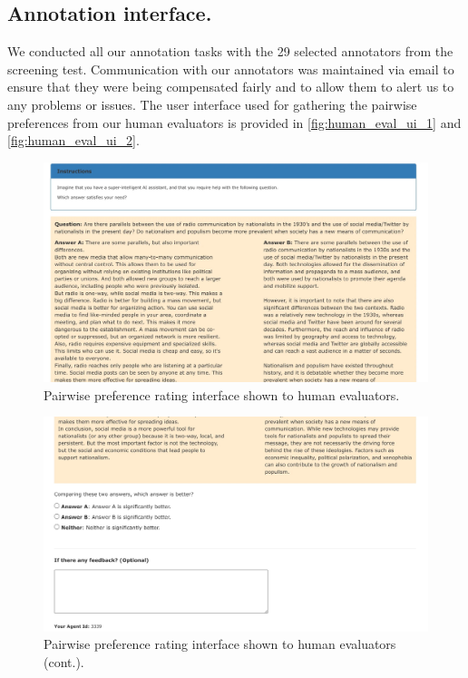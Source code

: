 \subsection{Annotation interface.} 

We conducted all our annotation tasks with the 29 selected annotators from the screening test. Communication with our annotators was maintained via email to ensure that they were being compensated fairly and to allow them to alert us to any problems or issues. The user interface used for gathering the pairwise preferences from our human evaluators is provided in \autoref{fig:human_eval_ui_1} and \autoref{fig:human_eval_ui_2}.

\begin{figure}
  \centering
  \includegraphics[width=1.0\columnwidth]{figs/human_eval_ui_1.jpeg}
  \caption{Pairwise preference rating interface shown to human evaluators. }
  \label{fig:human_eval_ui_1}
\end{figure}

\begin{figure}
  \centering
  \includegraphics[width=1.0\columnwidth]{figs/human_eval_ui_2.jpeg}
  \caption{Pairwise preference rating interface shown to human evaluators (cont.). }
  \label{fig:human_eval_ui_2}
\end{figure}

